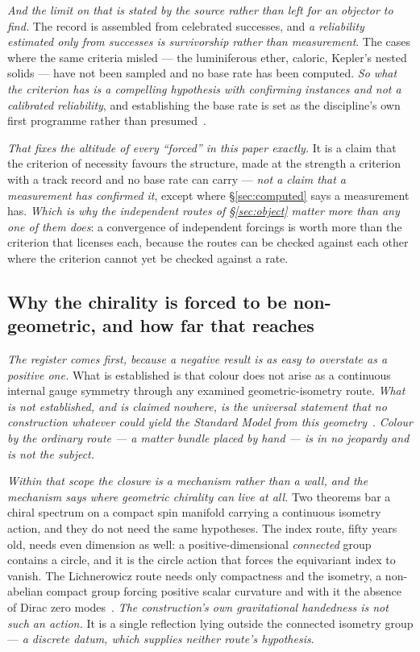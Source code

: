\documentclass[11pt,a4paper]{article}
\theoremstyle{plain}
\theoremstyle{definition}
\begin{document}
\emph{And the limit on that is stated by the source rather than left for an objector to find.} The record is
assembled from celebrated successes, and \emph{a reliability estimated only from successes is survivorship
rather than measurement}. The cases where the same criteria misled --- the luminiferous ether, caloric,
Kepler's nested solids --- have not been sampled and no base rate has been computed. \emph{So what the
criterion has is a compelling hypothesis with confirming instances and not a calibrated reliability}, and
establishing the base rate is set as the discipline's own first programme rather than
presumed~\cite{JanzenShadowExistence}.

\emph{That fixes the altitude of every ``forced'' in this paper exactly.} It is a claim that the criterion of
necessity favours the structure, made at the strength a criterion with a track record and no base rate can
carry --- \emph{not a claim that a measurement has confirmed it}, except where \S\ref{sec:computed} says a
measurement has. \emph{Which is why the independent routes of \S\ref{sec:object} matter more than any one of them
does}: a convergence of independent forcings is worth more than the criterion that licenses each, because
the routes can be checked against each other where the criterion cannot yet be checked against a rate.

\subsection{Why the chirality is forced to be non-geometric, and how far that reaches}

\emph{The register comes first, because a negative result is as easy to overstate as a positive one.} What is
established is that colour does not arise as a continuous internal gauge symmetry through any examined
geometric-isometry route. \emph{What is not established, and is claimed nowhere, is the universal statement
that no construction whatever could yield the Standard Model from this
geometry}~\cite{JanzenBoundary}. \emph{Colour by the ordinary route --- a matter bundle placed by hand --- is
in no jeopardy and is not the subject.}

\emph{Within that scope the closure is a mechanism rather than a wall, and the mechanism says where geometric
chirality can live at all.} Two theorems bar a chiral spectrum on a compact spin manifold carrying a
continuous isometry action, and they do not need the same hypotheses. The index route, fifty years old, needs
even dimension as well: a positive-dimensional \emph{connected} group contains a circle, and it is the circle
action that forces the equivariant index to vanish. The Lichnerowicz route needs only compactness and the
isometry, a non-abelian compact group forcing positive scalar curvature and with it the absence of Dirac zero
modes~\cite{JanzenBoundary}. \emph{The construction's own gravitational handedness is not such an action.} It
is a single reflection lying outside the connected isometry group --- \emph{a discrete datum, which supplies
neither route's hypothesis}.
\end{document}
